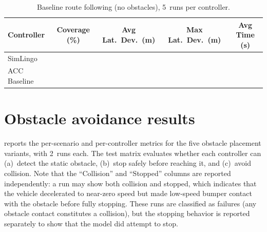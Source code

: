 \begin{table}[htbp]
\centering
\caption{Baseline route following (no obstacles), 5~runs per controller.}
\label{tab:baseline-comparison}
\begin{tabular}{lcccc}
\toprule
Controller & Coverage (\%) & Avg Lat.\ Dev.\ (m) & Max Lat.\ Dev.\ (m) & Avg Time (s)\\
\midrule
SimLingo & \textbf{} & \textbf{} & \textbf{} &  \\
ACC Baseline &  &  &  & \textbf{} \\
\bottomrule
\end{tabular}
\end{table}

\section{Obstacle avoidance results}
\label{sec:obstacle-results}

 reports the per-scenario and per-controller metrics for the five obstacle placement variants, with 2~runs each. The test matrix evaluates whether each controller can (a)~detect the static obstacle, (b)~stop safely before reaching it, and (c)~avoid collision. Note that the ``Collision'' and ``Stopped'' columns are reported independently: a run may show both collision and stopped, which indicates that the vehicle decelerated to near-zero speed but made low-speed bumper contact with the obstacle before fully stopping. These runs are classified as failures (any obstacle contact constitutes a collision), but the stopping behavior is reported separately to show that the model did attempt to stop.

\begin{table}[htbp]
\centering
\caption{Obstacle scenario results. Each variant is tested with 2~runs per controller.}
\label{tab:obstacle-results}
\end{table}

